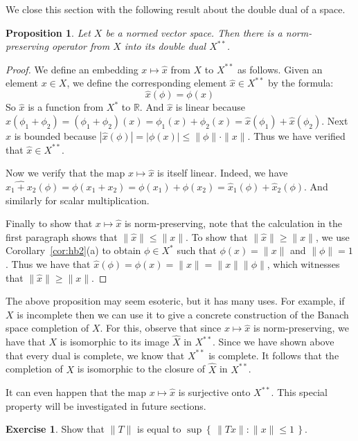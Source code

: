 \documentclass[11pt,oneside]{amsbook}
\newcommand{\set}[1]{\left\{\,#1\,\right\}}
\newcommand{\RR}{{\mathbb R}}
\theoremstyle{definition}
\newtheorem{exerc}{Exercise}[section]
\theoremstyle{plain}
\newtheorem{prop}[thm]{Proposition}
\theoremstyle{definition}
\theoremstyle{remark}
\numberwithin{equation}{section}
\numberwithin{figure}{section}
\begin{document}
We close this section with the following result about the double dual of a space.

\begin{prop}
  Let $X$ be a normed vector space. Then there is a norm-preserving operator from $X$ into its double dual $X^{**}$.
\end{prop}

\begin{proof}
  We define an embedding $x\mapsto\hat x$ from $X$ to $X^{**}$ as follows. Given an element $x\in X$, we define the corresponding element $\hat x\in X^{**}$ by the formula:
  \[\hat x(\phi)=\phi(x)
  \]
  So $\hat x$ is a function from $X^*$ to $\RR$. And $\hat x$ is linear because $\hat x(\phi_1+\phi_2)=(\phi_1+\phi_2)(x)=\phi_1(x)+\phi_2(x)=\hat x(\phi_1)+\hat x(\phi_2)$. Next $\hat x$ is bounded because $|\hat x(\phi)|=|\phi(x)|\leq\|\phi\|\cdot\|x\|$. Thus we have verified that $\hat x\in X^{**}$.

  Now we verify that the map $x\mapsto\hat x$ is itself linear. Indeed, we have $\widehat{x_1+x_2}(\phi)=\phi(x_1+x_2)=\phi(x_1)+\phi(x_2)=\hat x_1(\phi)+\hat x_2(\phi)$. And similarly for scalar multiplication.

  Finally to show that $x\mapsto\hat x$ is norm-preserving, note that the calculation in the first paragraph shows that $\|\hat x\|\leq\|x\|$. To show that $\|\hat x\|\geq\|x\|$, we use Corollary~\ref{cor:hb2}(a) to obtain $\phi\in X^*$ such that $\phi(x)=\|x\|$ and $\|\phi\|=1$. Thus we have that $\hat x(\phi)=\phi(x)=\|x\|=\|x\|\|\phi\|$, which witnesses that $\|\hat x\|\geq\|x\|$.
\end{proof}

The above proposition may seem esoteric, but it has many uses. For example, if $X$ is incomplete then we can use it to give a concrete construction of the Banach space completion of $X$. For this, observe that since $x\mapsto\hat x$ is norm-preserving, we have that $X$ is isomorphic to its image $\hat X$ in $X^{**}$. Since we have shown above that every dual is complete, we know that $X^{**}$ is complete. It follows that the completion of $X$ is isomorphic to the closure of $\hat X$ in $X^{**}$.

It can even happen that the map $x\mapsto\hat x$ is surjective onto $X^{**}$. This special property will be investigated in future sections.

\begin{exerc}
  Show that $\|T\|$ is equal to $\sup\set{\|Tx\|:\|x\|\leq1}$.
\end{exerc}
\end{document}
